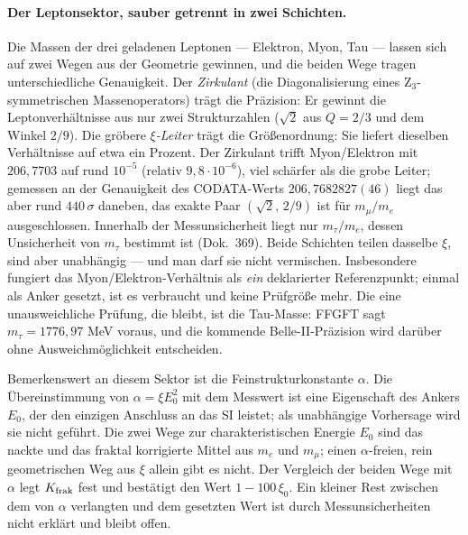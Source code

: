 \paragraph{Der Leptonsektor, sauber getrennt in zwei Schichten.}
Die Massen der drei geladenen Leptonen --- Elektron, Myon, Tau ---
lassen sich auf zwei Wegen aus der Geometrie gewinnen, und die beiden
Wege tragen unterschiedliche Genauigkeit. Der \emph{Zirkulant} (die
Diagonalisierung eines Z$_3$-symmetrischen Massenoperators) trägt die
Präzision: Er gewinnt die Leptonverhältnisse aus nur zwei
Strukturzahlen ($\sqrt2$ aus $Q=2/3$ und dem Winkel $2/9$). Die
gröbere \emph{$\xi$-Leiter} trägt die Größenordnung: Sie liefert
dieselben Verhältnisse auf etwa ein Prozent. Der Zirkulant trifft
Myon/Elektron mit $206{,}7703$ auf rund $10^{-5}$ (relativ
$9{,}8\cdot10^{-6}$), viel schärfer als die grobe Leiter; gemessen an
der Genauigkeit des CODATA-Werts $206{,}7682827(46)$ liegt das aber
rund $440\,\sigma$ daneben, das exakte Paar $(\sqrt2,\,2/9)$ ist für
$m_\mu/m_e$ ausgeschlossen. Innerhalb der Messunsicherheit liegt nur
$m_\tau/m_e$, dessen Unsicherheit von $m_\tau$ bestimmt ist (Dok.~369).
Beide Schichten teilen dasselbe
$\xi$, sind aber unabhängig --- und man darf sie nicht vermischen. Insbesondere fungiert das Myon/Elektron-Verhältnis als
\emph{ein} deklarierter Referenzpunkt; einmal als Anker gesetzt, ist es
verbraucht und keine Prüfgröße mehr. Die eine unausweichliche Prüfung,
die bleibt, ist die Tau-Masse: FFGFT sagt $m_\tau = 1776{,}97$ MeV voraus,
und die kommende Belle-II-Präzision wird darüber ohne Ausweichmöglichkeit
entscheiden.

Bemerkenswert an diesem Sektor ist die Feinstrukturkonstante $\alpha$.
Die Übereinstimmung von $\alpha = \xi E_0^2$ mit dem Messwert ist eine
Eigenschaft des Ankers $E_0$, der den einzigen Anschluss an das SI
leistet; als unabhängige Vorhersage wird sie nicht geführt. Die zwei
Wege zur charakteristischen Energie $E_0$ sind das nackte und das
fraktal korrigierte Mittel aus $m_e$ und $m_\mu$; einen
$\alpha$-freien, rein geometrischen Weg aus $\xi$ allein gibt es
nicht. Der Vergleich der beiden Wege mit $\alpha$ legt $K_{\rm frak}$
fest und bestätigt den Wert $1-100\,\xi_0$. Ein kleiner Rest zwischen
dem von $\alpha$ verlangten und dem gesetzten Wert ist durch
Messunsicherheiten nicht erklärt und bleibt offen.

